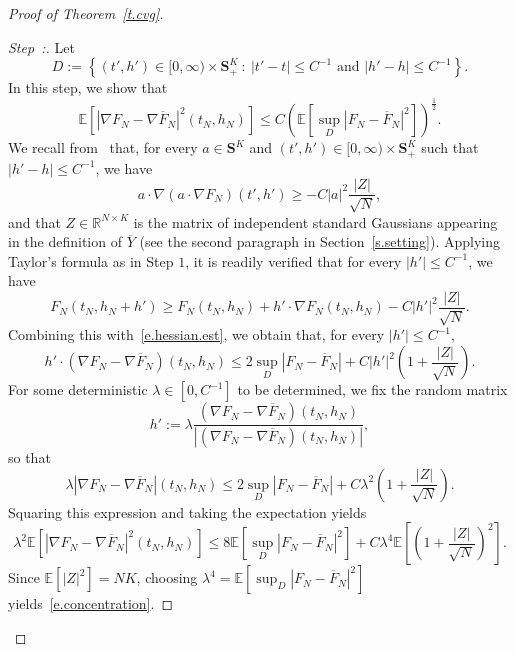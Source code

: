\documentclass[10pt]{amsart}
\theoremstyle{definition}\newtheorem{defi}[theo]{Definition}\newtheorem{rema}[theo]{Remark}\newtheorem{exam}[theo]{Example}\newtheorem{exem}[theo]{Example}\newtheorem{nota}[theo]{Notation}
\newcommand{\R}{\mathbb{R}}
\newcommand{\E}{\mathbb{E}}
\renewcommand{\S}{\mathbf{S}}
\renewcommand{\le}{\leqslant}
\renewcommand{\ge}{\geqslant}
\renewcommand{\bar}{\overline}
\newcommand{\Ll}{\left}
\newcommand{\Rr}{\right}
\newcounter{stepcount}
\newenvironment{step}{\refstepcounter{stepcount}\begin{proof}[Step~\thestepcount:]}{\let\qed\relax\end{proof}}
\begin{document}
\begin{proof}[Proof of Theorem~\ref{t.cvg}]
\begin{step}\label{proof-the5.1-step2}
Let
\begin{equation*}
D := \Ll\{ \Ll(t',h'\Rr) \in [0,\infty) \times \S^K_+ \ : \ \Ll|t'-t\Rr| \le C^{-1} \text{ and } \Ll|h'-h\Rr| \le C^{-1} \Rr\}.
\end{equation*}
In this step, we show that
\begin{equation}\label{e.concentration}
\E \Ll[\Ll|\nabla F_N - \nabla \bar F_N\Rr|^2\Ll(t_N,h_N\Rr) \Rr] \le C \Ll(\E \Ll[\sup_D \Ll|F_N - \bar F_N\Rr|^2 \Rr]\Rr)^\frac 1 2.
\end{equation}
We recall from~\cite[(3.13)]{HBJ} that, for every $a \in \S^K$ and $(t',h') \in [0,\infty) \times \S^K_+$ such that $|h'-h| \le C^{-1}$, we have
\begin{equation*}
a \cdot \nabla \Ll(a \cdot \nabla F_N\Rr)\Ll(t',h'\Rr) \ge -C |a|^2 \frac{|Z|}{\sqrt{N}},
\end{equation*}
and that $Z\in\R^{N\times K}$ is the matrix of independent standard Gaussians appearing in the definition of $\overline{Y}$ (see the second paragraph in Section~\ref{s.setting}). Applying Taylor's formula as in Step $1$, it is readily verified that for every $|h'| \le C^{-1}$, we have
\begin{equation*}
F_N\Ll(t_N,h_N+ h'\Rr) \ge F_N\Ll(t_N,h_N\Rr) + h' \cdot \nabla F_N\Ll(t_N,h_N\Rr) - C |h'|^2 \frac{|Z|}{\sqrt{N}}.
\end{equation*}
Combining this with~\eqref{e.hessian.est}, we obtain that, for every $|h'| \le C^{-1}$,
\begin{equation*}
h' \cdot \Ll(\nabla F_N - \nabla \bar F_N\Rr)\Ll(t_N,h_N\Rr)\le 2 \sup_D \Ll|F_N - \bar F_N\Rr| + C |h'|^2 \Ll(1+\frac{|Z|}{\sqrt{N}}\Rr).
\end{equation*}
For some deterministic $\lambda \in [0,C^{-1}]$ to be determined, we fix {the random matrix}
\begin{equation*}
h' := \lambda \frac{\Ll(\nabla F_N - \nabla \bar F_N\Rr)\Ll(t_N,h_N\Rr)}{\Ll|\Ll(\nabla F_N - \nabla \bar F_N\Rr)\Ll(t_N,h_N\Rr)\Rr|},
\end{equation*}
so that
\begin{equation*}
\lambda |\nabla F_N - \nabla \bar F_N|(t_N,h_N) \le 2 \sup_D |F_N - \bar F_N| + C \lambda^2 \Ll(1+\frac{|Z|}{\sqrt{N}}\Rr).
\end{equation*}
Squaring this expression and taking the expectation yields
\begin{equation*}
\lambda^2 \E \Ll[|\nabla F_N - \nabla \bar F_N|^2(t_N,h_N) \Rr] \le 8 \E \Ll[\sup_D |F_N - \bar F_N|^2 \Rr] + C \lambda^4 \E \Ll[\Ll(1+\frac{|Z|}{\sqrt{N}}\Rr)^2\Rr].
\end{equation*}
Since $\E[|Z|^2] = NK$, choosing $\lambda^4 = \E \Ll[\sup_D |F_N - \bar F_N|^2 \Rr] $ yields~\eqref{e.concentration}.
\end{step}



\end{proof}
\end{document}

